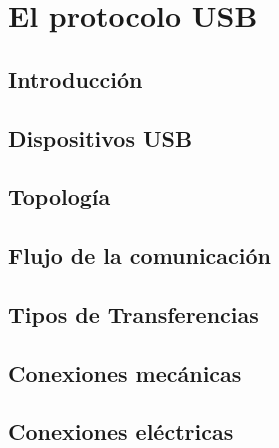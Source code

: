 \chapter{El protocolo USB}
	\label{usb:int}
	
		\section{Introducción}
			\label{usb:ov}
			
		\section{Dispositivos USB}
		\section{Topología}
		\section{Flujo de la comunicación}
		\section{Tipos de Transferencias}
		\section{Conexiones mecánicas}
		\section{Conexiones eléctricas}